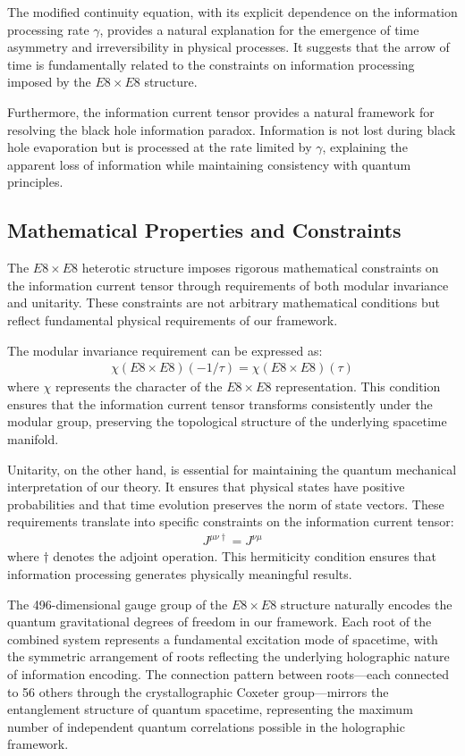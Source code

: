 \documentclass[11pt,english,twoside]{article}
\begin{document}
The modified continuity equation, with its explicit dependence on the information processing rate $\gamma$, provides a natural explanation for the emergence of time asymmetry and irreversibility in physical processes. It suggests that the arrow of time is fundamentally related to the constraints on information processing imposed by the $E8\times E8$ structure.

Furthermore, the information current tensor provides a natural framework for resolving the black hole information paradox. Information is not lost during black hole evaporation but is processed at the rate limited by $\gamma$, explaining the apparent loss of information while maintaining consistency with quantum principles.

\subsection{Mathematical Properties and Constraints}

The $E8\times E8$ heterotic structure imposes rigorous mathematical constraints on the information current tensor through requirements of both modular invariance and unitarity. These constraints are not arbitrary mathematical conditions but reflect fundamental physical requirements of our framework.

The modular invariance requirement can be expressed as:
\begin{align}
    \chi(E8\times E8)(-1/\tau) = \chi(E8\times E8)(\tau)
\end{align}
where $\chi$ represents the character of the $E8\times E8$ representation. This condition ensures that the information current tensor transforms consistently under the modular group, preserving the topological structure of the underlying spacetime manifold.

Unitarity, on the other hand, is essential for maintaining the quantum mechanical interpretation of our theory. It ensures that physical states have positive probabilities and that time evolution preserves the norm of state vectors. These requirements translate into specific constraints on the information current tensor:
\begin{align}
    J^{\mu\nu\dagger} = J^{\nu\mu}
\end{align}
where $\dagger$ denotes the adjoint operation. This hermiticity condition ensures that information processing generates physically meaningful results.

The 496-dimensional gauge group of the $E8\times E8$ structure naturally encodes the quantum gravitational degrees of freedom in our framework. Each root of the combined system represents a fundamental excitation mode of spacetime, with the symmetric arrangement of roots reflecting the underlying holographic nature of information encoding. The connection pattern between roots—each connected to 56 others through the crystallographic Coxeter group—mirrors the entanglement structure of quantum spacetime, representing the maximum number of independent quantum correlations possible in the holographic framework.
\end{document}
